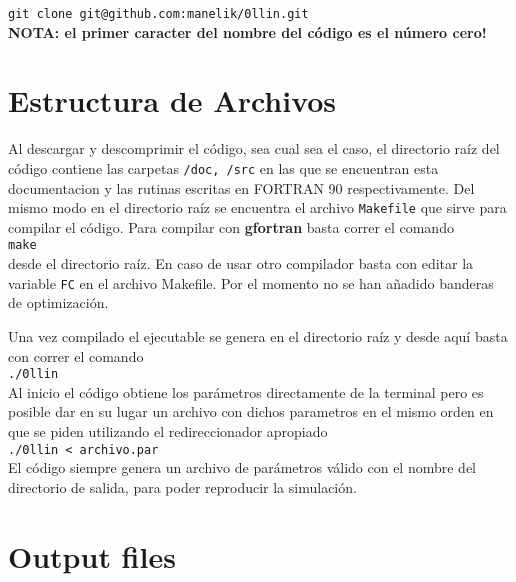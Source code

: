 \documentclass[12pt,fleqn,b5paper]{article}
\begin{document}
\texttt{\footnotesize git clone 
  git@github.com:manelik/0llin.git} \\

{\bf NOTA: el primer caracter del nombre del código es el número
  cero!}


\section{Estructura de Archivos}

Al descargar y descomprimir el código, sea cual sea el caso, el
directorio raíz del código contiene las carpetas \texttt{/doc, /src}
en las que se encuentran esta documentacion y las rutinas escritas en
FORTRAN 90 respectivamente. Del mismo modo en el directorio raíz se
encuentra el archivo \texttt{Makefile} que sirve para compilar el
código. Para compilar con {\bf gfortran} basta correr el comando\\

\texttt{make} \\

desde el directorio raíz. En caso de usar otro compilador basta con
editar la variable \texttt{FC} en el archivo Makefile. Por el momento
no se han añadido banderas de optimización.

Una vez compilado el ejecutable se genera en el directorio raíz y
desde aquí basta con correr el comando\\

\texttt{./0llin} \\

Al inicio el código obtiene los parámetros directamente de la terminal
pero es posible dar en su lugar un archivo con dichos parametros en el
mismo orden en que se piden utilizando el redireccionador apropiado\\

\texttt{./0llin < archivo.par} \\

El código siempre genera un archivo de parámetros válido con el nombre
del directorio de salida, para poder reproducir la simulación.




\section{Output files}
\end{document}
